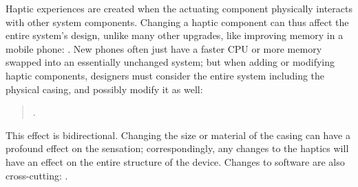Haptic experiences are %
created when the actuating component physically interacts with other system components.
Changing a haptic component can thus affect the entire system's design, unlike 
many other upgrades, like improving memory in a mobile phone: .
New phones often just have a faster CPU or more memory swapped into an essentially unchanged %
system; but
when adding or modifying haptic components, designers must consider the entire system including the physical casing, and possibly modify it as well:

\begin{quote}
.
\end{quote}

\noindent This effect is bidirectional. 
Changing the size or material of the casing can have a profound effect on the sensation; correspondingly, any changes to the haptics will have an effect on the entire structure of the device.
Changes to software are also cross-cutting:
.





